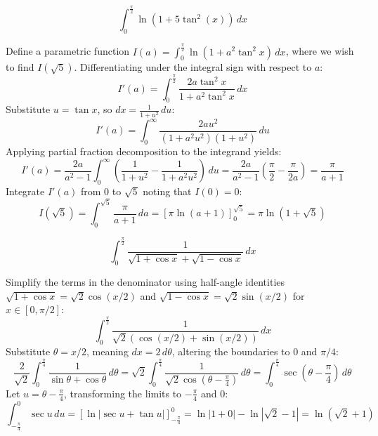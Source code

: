\begin{questions}
    \question
    \[ \int_{0}^{\frac{\pi}{2}} \ln(1 + 5\tan^2(x)) \, dx \]
    \begin{solution}
        Define a parametric function $I(a) = \int_{0}^{\frac{\pi}{2}} \ln(1 + a^2\tan^2 x) \, dx$, where we wish to find $I(\sqrt{5})$. Differentiating under the integral sign with respect to $a$:
        \[ I'(a) = \int_{0}^{\frac{\pi}{2}} \frac{2a\tan^2 x}{1 + a^2\tan^2 x} \, dx \]
        Substitute $u = \tan x$, so $dx = \frac{1}{1+u^2} \, du$:
        \[ I'(a) = \int_{0}^{\infty} \frac{2a u^2}{(1 + a^2 u^2)(1 + u^2)} \, du \]
        Applying partial fraction decomposition to the integrand yields:
        \[ I'(a) = \frac{2a}{a^2 - 1} \int_{0}^{\infty} \left( \frac{1}{1+u^2} - \frac{1}{1+a^2u^2} \right) \, du = \frac{2a}{a^2 - 1} \left( \frac{\pi}{2} - \frac{\pi}{2a} \right) = \frac{\pi}{a+1} \]
        Integrate $I'(a)$ from $0$ to $\sqrt{5}$ noting that $I(0) = 0$:
        \[ I(\sqrt{5}) = \int_{0}^{\sqrt{5}} \frac{\pi}{a+1} \, da = \left[ \pi \ln(a+1) \right]_{0}^{\sqrt{5}} = \pi \ln(1 + \sqrt{5}) \]
    \end{solution}

    \question
    \[ \int_{0}^{\frac{\pi}{2}} \frac{1}{\sqrt{1 + \cos x} + \sqrt{1 - \cos x}} \, dx \]
    \begin{solution}
        Simplify the terms in the denominator using half-angle identities $\sqrt{1+\cos x} = \sqrt{2}\cos(x/2)$ and $\sqrt{1-\cos x} = \sqrt{2}\sin(x/2)$ for $x \in [0, \pi/2]$:
        \[ \int_{0}^{\frac{\pi}{2}} \frac{1}{\sqrt{2}\left(\cos(x/2) + \sin(x/2)\right)} \, dx \]
        Substitute $\theta = x/2$, meaning $dx = 2 \, d\theta$, altering the boundaries to $0$ and $\pi/4$:
        \[ \frac{2}{\sqrt{2}} \int_{0}^{\frac{\pi}{4}} \frac{1}{\sin\theta + \cos\theta} \, d\theta = \sqrt{2} \int_{0}^{\frac{\pi}{4}} \frac{1}{\sqrt{2}\cos\left(\theta - \frac{\pi}{4}\right)} \, d\theta = \int_{0}^{\frac{\pi}{4}} \sec\left(\theta - \frac{\pi}{4}\right) \, d\theta \]
        Let $u = \theta - \frac{\pi}{4}$, transforming the limits to $-\frac{\pi}{4}$ and $0$:
        \[ \int_{-\frac{\pi}{4}}^{0} \sec u \, du = \left[ \ln|\sec u + \tan u| \right]_{-\frac{\pi}{4}}^{0} = \ln|1+0| - \ln|\sqrt{2}-1| = \ln(\sqrt{2}+1) \]
    \end{solution}


\end{questions}
